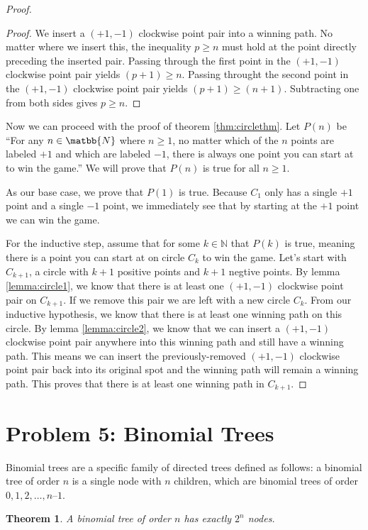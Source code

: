 \documentclass[10pt,letter]{article}
\newtheorem*{thm}{Theorem}
\begin{document}
\begin{proof}
\begin{proof}
We insert a $(+1, -1)$ clockwise point pair into a winning path. No matter where we insert this, the inequality $p \ge n$ must hold at the point directly preceding the inserted pair. Passing through the first point in the $(+1, -1)$ clockwise point pair yields $(p+1) \ge n$. Passing throught the second point in the $(+1, -1)$ clockwise point pair yields $(p+1) \ge (n+1)$. Subtracting one from both sides gives $p \ge n$.
\end{proof}

Now we can proceed with the proof of theorem \ref{thm:circlethm}. Let $P(n)$ be ``For any $n \in \matbb{N}$ where $n \ge 1$, no matter which of the $n$ points are labeled $+1$ and which are labeled $-1$, there is always one point you can start at to win the game.'' We will prove that $P(n)$ is true for all $n \ge 1$.

As our base case, we prove that $P(1)$ is true. Because $C_1$ only has a single $+1$ point and a single $-1$ point, we immediately see that by starting at the $+1$ point we can win the game.

For the inductive step, assume that for some $k \in \mathbb{N}$ that $P(k)$ is true, meaning there is a point you can start at on circle $C_k$ to win the game. Let's start with $C_{k+1}$, a circle with $k+1$ positive points and $k+1$ negtive points. By lemma \ref{lemma:circle1}, we know that there is at least one $(+1, -1)$ clockwise point pair on $C_{k+1}$. If we remove this pair we are left with a new circle $C_k$. From our inductive hypothesis, we know that there is at least one winning path on this circle. By lemma \ref{lemma:circle2}, we know that we can insert a $(+1, -1)$ clockwise point pair anywhere into this winning path and still have a winning path. This means we can insert the previously-removed $(+1, -1)$ clockwise point pair back into its original spot and the winning path will remain a winning path. This proves that there is at least one winning path in $C_{k+1}$. 
\end{proof}

\section{Problem 5: Binomial Trees}
Binomial trees are a specific family of directed trees defined as follows: a binomial tree of order $n$ is a single node with $n$ children, which are binomial trees of order $0, 1, 2, \ldots, n – 1$. 

\begin{thm}
A binomial tree of order $n$ has exactly $2^n$ nodes.
\end{thm}
\end{document}
